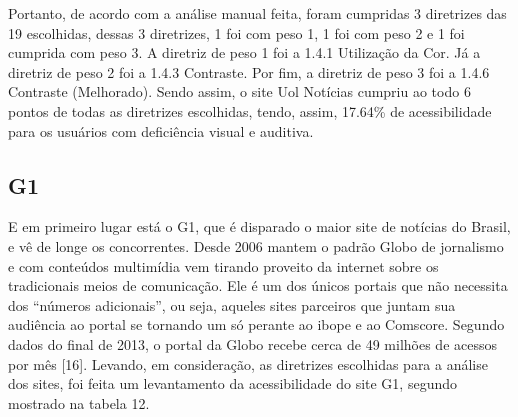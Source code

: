 \documentclass[a4paper]{article}
\begin{document}
\begin{titlepage}
Portanto, de acordo com a análise manual feita, foram cumpridas 3 diretrizes das 19 escolhidas, dessas 3 diretrizes, 1 foi com peso 1, 1 foi com peso 2 e 1 foi cumprida com peso 3. A diretriz de peso 1 foi a 1.4.1 Utilização da Cor. Já a diretriz de peso 2 foi a 1.4.3 Contraste. Por fim, a diretriz de peso 3 foi a 1.4.6 Contraste (Melhorado). Sendo assim, o site Uol Notícias cumpriu ao todo 6 pontos de todas as diretrizes escolhidas, tendo, assim, 17.64\% de acessibilidade para os usuários com deficiência visual e auditiva.

\subsection{G1}

E em primeiro lugar está o G1, que é disparado o maior site de notícias do Brasil, e vê de longe os concorrentes. Desde 2006 mantem o padrão Globo de jornalismo e com conteúdos multimídia vem tirando proveito da internet sobre os tradicionais meios de comunicação. Ele é um dos únicos portais que não necessita dos “números adicionais”, ou seja, aqueles sites parceiros que juntam sua audiência ao portal se tornando um só perante ao ibope e ao Comscore. Segundo dados do final de 2013, o portal da Globo recebe cerca de 49 milhões de acessos por mês [16]. Levando, em consideração, as diretrizes escolhidas para a análise dos sites, foi feita um levantamento da acessibilidade do site G1, segundo mostrado na tabela 12.\\


\end{titlepage}
\end{document}
